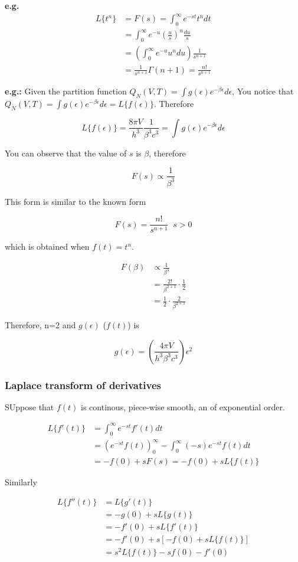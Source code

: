 \textbf{e.g.}
\begin{align*}
    L\{t^n\} &= F(s) = \int_0^\infty{e^{-st} t^n dt} \\
    &= \int_0^\infty{e^{-u} \left(\frac{u}{s}\right)^n \frac{du}{s}}\\
    &= \left(\int_0^\infty{e^{-u} u^n du}\right) \frac{1}{s^{n+1}}\\
    &= \frac{1}{s^{n+1}} \Gamma(n+1) = \frac{n!}{s^{n+1}}
\end{align*}

\textbf{e.g.:} Given the partition function $Q_N(V, T) = \int{g(\epsilon) e^{-\beta \epsilon} d\epsilon}$, You notice that $Q_N(V, T) = \int{g(\epsilon) e^{-\beta \epsilon} d\epsilon} = L\{f(\epsilon)\}$. Therefore

$$
L\{f(\epsilon)\} = \frac{8 \pi V}{h^3} \frac{1}{\beta^3 c^3} = \int{g(\epsilon) e^{-\beta \epsilon} d\epsilon}
$$

You can observe that the value of $s$ is $\beta$, therefore

$$
F(s) \propto \frac{1}{\beta^3}
$$

This form is similar to the known form

$$
F(s) = \frac{n!}{s^{n+1}} \;\; s>0
$$

which is obtained when $f(t) = t^n$.

\begin{align*}
    F(\beta) &\propto \frac{1}{\beta^3} \\
    &= \frac{2!}{\beta^{2+1}} \cdot \frac{1}{2} \\
    &= \frac{1}{2} \cdot \frac{2}{\beta^{2+1}}
\end{align*}

Therefore, n=2 and $g(\epsilon)$ ($f(t)$) is

$$
g(\epsilon) = \left(\frac{4\pi V}{h^3 \beta^3 c^3}\right) \epsilon^2
$$

\subsubsection{Laplace transform of derivatives}

SUppose that $f(t)$ is continous, piece-wise smooth, an of exponential order.


\begin{align*}
    L\{f'(t)\} &= \int_0^\infty{e^{-st}f'(t)dt} \\
    &= \left(e^{-st} f(t)\right)_0^\infty - \int_0^\infty{(-s) e^{-st} f(t) dt} \\
    &=  - f(0) + s F(s) = -f(0) + sL\{f(t)\}
\end{align*}

Similarly

\begin{align*}
    L\{f''(t)\} &= L\{g'(t)\}\\
    &= -g(0)  + s L\{g(t)\} \\
    &= - f'(0) + s L\{f'(t)\} \\
    &= -f'(0) + s\left[-f(0) + s L\{f(t)\} \right]\\
    &= s^2 L\{f(t)\} - sf(0) - f'(0)
\end{align*}

